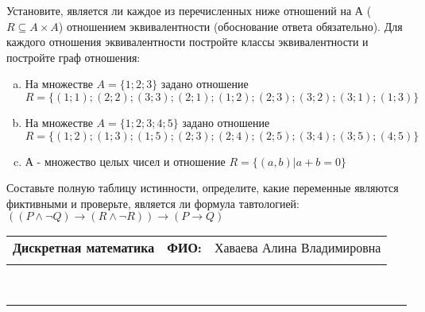\documentclass[10pt]{exam}
\newcommand{\class}{Дискретная математика}
\newcommand{\examdate}{}
\begin{document}
\begin{questions}
\question
Установите, является ли каждое из перечисленных ниже отношений на А ($R \subseteq A \times A$) отношением эквивалентности (обоснование ответа обязательно). Для каждого отношения эквивалентности постройте классы 
эквивалентности и постройте граф отношения:
\begin{enumerate} [a)]\setcounter{enumi}{0}
\item На множестве $A = \{1; 2; 3\}$ задано отношение $R = \{(1; 1); (2; 2); (3; 3); (2; 1); (1; 2); (2; 3); (3; 2); (3; 1); (1; 3)\}$
\item На множестве $A = \{1; 2; 3; 4; 5\}$ задано отношение $R = \{(1; 2); (1; 3); (1; 5); (2; 3); (2; 4); (2; 5); (3; 4); (3; 5); (4; 5)\}$
\item А - множество целых чисел и отношение $R = \{(a,b)|a + b = 0\}$
\end{enumerate}\question Составьте полную таблицу истинности, определите, какие переменные являются фиктивными и проверьте, является ли формула тавтологией:
$(( P \land \neg Q) \rightarrow (R \land \neg R)) \rightarrow (P \rightarrow Q)$

\end{questions}
\newpage
\begin{flushright}
\begin{tabular}{p{2.8in} r l}
\textbf{\class} & \textbf{ФИО:} &Хаваева Алина Владимировна
\\

\textbf{\examdate} &&\\
\end{tabular}\\
\end{flushright}
\rule[1ex]{\textwidth}{.1pt}
\end{document}
